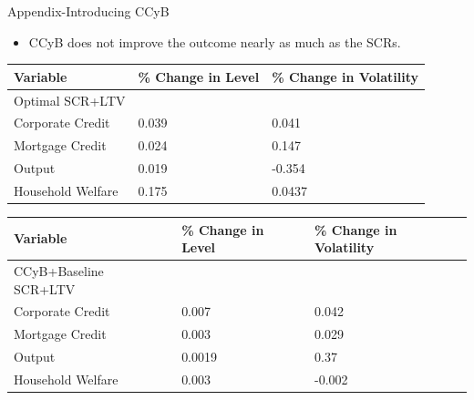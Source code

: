 \documentclass[8pt,aspectratio=169]{beamer}
\numberwithin{equation}{section}
\begin{document}
\begin{frame}{Appendix-Introducing CCyB}

\begin{itemize}
\item CCyB does not improve the outcome nearly as much as the SCRs.

\end{itemize}


\begin{table}[h]
\begin{tabular}{l|l|l}
\small
Variable & \% Change in Level & \% Change in Volatility \\
\hline
Optimal SCR+LTV & & \\
\hline
    Corporate Credit           &       0.039    &      0.041 \\
    Mortgage Credit            &      0.024    &       0.147 \\
    Output         &     0.019    &    -0.354 \\ 
    Household Welfare       &     0.175     &     0.0437\\
\end{tabular}
\end{table}



\begin{table}[h]
\begin{tabular}{l|l|l}
\small
Variable & \% Change in Level & \% Change in Volatility \\
\hline
CCyB+Baseline SCR+LTV & & \\
\hline
    Corporate Credit           &       0.007    &      0.042 \\
    Mortgage Credit            &      0.003    &       0.029 \\
    Output         &     0.0019    &    0.37 \\ 
    Household Welfare       &     0.003     &     -0.002\\
  

  \end{tabular}
\end{table}


\end{frame}
\end{document}
